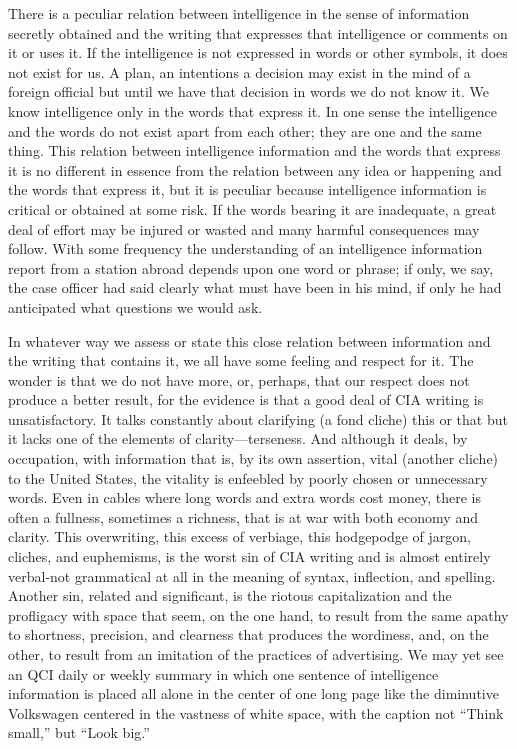 \documentclass[
    oneside,
    11pt,
]{memoir}
\begin{document}
There is a peculiar relation between intelligence in the sense of information secretly obtained and the writing that expresses that intelligence or comments on it or uses it. If the intelligence is not expressed in words or other symbols, it does not exist for us. A plan, an intentions a decision may exist in the mind of a foreign official but until we have that decision in words we do not know it. We know intelligence only in the words that express it. In one sense the intelligence and the words do not exist apart from each other; they are one and the same thing. This relation between intelligence information and the words that express it is no different in essence from the relation between any idea or happening and the words that express it, but it is peculiar because intelligence information is critical or obtained at some risk. If the words bearing it are inadequate, a great deal of effort may be injured or wasted and many harmful consequences may follow. With some frequency the understanding of an intelligence information report from a station abroad depends upon one word or phrase; if only, we say, the case officer had said clearly what must have been in his mind, if only he had anticipated what questions we would ask.

In whatever way we assess or state this close relation between information and the writing that contains it, we all have some feeling and respect for it. The wonder is that we do not have more, or, perhaps, that our respect does not produce a better result, for the evidence is that a good deal of CIA writing is unsatisfactory. It talks constantly about clarifying (a fond cliche) this or that but it lacks one of the elements of clarity---terseness. And although it deals, by occupation, with information that is, by its own assertion, vital (another cliche) to the United States, the vitality is enfeebled by poorly chosen or unnecessary words. Even in cables where long words and extra words cost money, there is often a fullness, sometimes a richness, that is at war with both economy and clarity. This overwriting, this excess of verbiage, this hodgepodge of jargon, cliches, and euphemisms, is the worst sin of CIA writing and is almost entirely verbal-not grammatical at all in the meaning of syntax, inflection, and spelling. Another sin, related and significant, is the riotous capitalization and the profligacy with space that seem, on the one hand, to result from the same apathy to shortness, precision, and clearness that produces the wordiness, and, on the other, to result from an imitation of the practices of advertising. We may yet see an QCI daily or weekly summary in which one sentence of intelligence information is placed all alone in the center of one long page like the diminutive Volkswagen centered in the vastness of white space, with the caption not \enquote{Think small,} but \enquote{Look big.}
\end{document}
